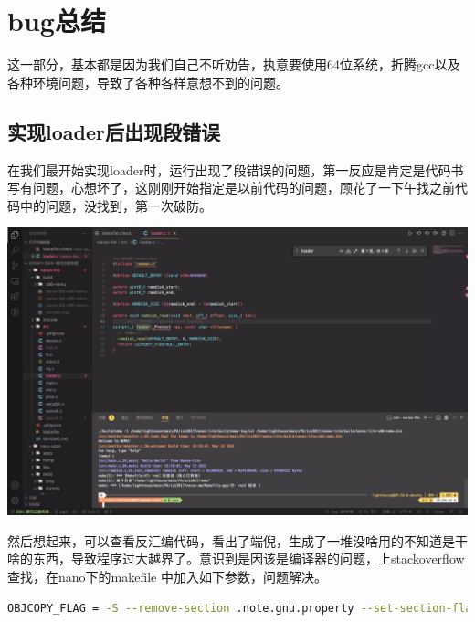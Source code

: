 \documentclass[UTF8,a4paper,10pt]{ctexart}
\begin{document}
\section{bug总结}
这一部分，基本都是因为我们自己不听劝告，执意要使用64位系统，折腾gcc以及各种环境问题，导致了各种各样意想不到的问题。
\subsection{实现loader后出现段错误}
在我们最开始实现loader时，运行出现了段错误的问题，第一反应是肯定是代码书写有问题，心想坏了，这刚刚开始指定是以前代码的问题，顾花了一下午找之前代码中的问题，没找到，第一次破防。

\begin{center}
  \includegraphics*[scale=0.1]{pic/报错1}
\end{center}

然后想起来，可以查看反汇编代码，看出了端倪，生成了一堆没啥用的不知道是干啥的东西，导致程序过大越界了。意识到是因该是编译器的问题，上stackoverflow查找，在nano下的makefile 中加入如下参数，问题解决。
\begin{lstlisting}[language = bash]
OBJCOPY_FLAG = -S --remove-section .note.gnu.property --set-section-flags .bss=alloc,contents -O binary
\end{lstlisting}
\end{document}
